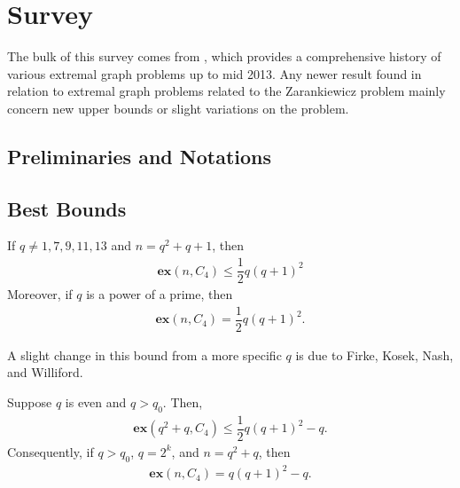 \section{Survey}

The bulk of this survey comes from \cite{FurSim2013}, which provides a comprehensive history of various extremal graph problems up to mid 2013. Any newer result found in relation to extremal graph problems related to the Zarankiewicz problem mainly concern new upper bounds or slight variations on the problem.

\subsection{Preliminaries and Notations}

\subsection{Best Bounds}
\begin{theorem}
	If $q \neq 1, 7, 9, 11, 13$ and $n = q^2 + q + 1$, then
	\begin{align*}
		\mathbf{ex}(n,C_4) \leq \dfrac{1}{2}q(q+1)^2
	\end{align*}
	Moreover, if $q$ is a power of a prime, then
	\begin{align*}
		\mathbf{ex}(n,C_4) = \dfrac{1}{2}q(q+1)^2.
	\end{align*}
\end{theorem}

A slight change in this bound from a more specific $q$ is due to Firke, Kosek, Nash, and Williford.
\begin{theorem}
	Suppose $q$ is even and $q > q_0$. Then,
	\begin{align*}
		\mathbf{ex}(q^2+q, C_4) \leq \dfrac{1}{2}q(q+1)^2 - q.
	\end{align*}
	Consequently, if $q > q_0$, $q = 2^k$, and $n = q^2 + q$, then
	\begin{align*}
		\mathbf{ex}(n,C_4) = q(q+1)^2 - q.
	\end{align*}
\end{theorem}